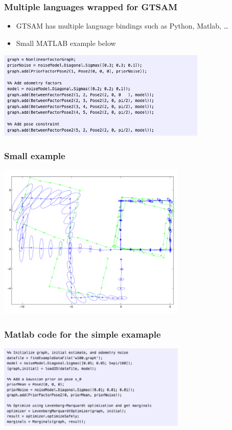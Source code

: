 \documentclass[10pt]{beamer}
\begin{document}
\begin{frame}
  \frametitle{Multiple languages wrapped for GTSAM}
  \begin{itemize}
    \item GTSAM has multiple language bindings such as Python, Matlab, \dots
    \item Small MATLAB example below
  \end{itemize}
  \centerline{\includegraphics[width=10cm]{gtsam-poseslam-matlab.png}}
\end{frame}

\begin{frame}
  \frametitle{Small example}
  \centerline{\includegraphics[width=9cm]{w100-result.png}}
\end{frame}

\begin{frame}
  \frametitle{Matlab code for the simple examaple}
  \centerline{\includegraphics[width=9cm]{w100-matlab.png}}
\end{frame}
\end{document}
